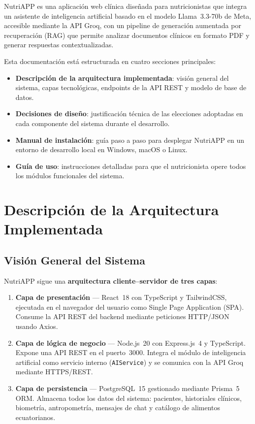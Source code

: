 \documentclass[12pt,a4paper]{article}
\begin{document}
NutriAPP es una aplicación web clínica diseñada para nutricionistas que integra
un asistente de inteligencia artificial basado en el modelo Llama~3.3-70b de Meta,
accesible mediante la API Groq, con un pipeline de generación aumentada por recuperación
(RAG) que permite analizar documentos clínicos en formato PDF y generar respuestas
contextualizadas.

Esta documentación está estructurada en cuatro secciones principales:

\begin{itemize}[leftmargin=1.5em]
  \item \textbf{Descripción de la arquitectura implementada}: visión general del
        sistema, capas tecnológicas, endpoints de la API REST y modelo de base de datos.
  \item \textbf{Decisiones de diseño}: justificación técnica de las elecciones
        adoptadas en cada componente del sistema durante el desarrollo.
  \item \textbf{Manual de instalación}: guía paso a paso para desplegar NutriAPP
        en un entorno de desarrollo local en Windows, macOS o Linux.
  \item \textbf{Guía de uso}: instrucciones detalladas para que el nutricionista
        opere todos los módulos funcionales del sistema.
\end{itemize}

\clearpage
\section{Descripción de la Arquitectura Implementada}

\subsection{Visión General del Sistema}

NutriAPP sigue una \textbf{arquitectura cliente--servidor de tres capas}:

\begin{enumerate}[leftmargin=2em]
  \item \textbf{Capa de presentación} — React~18 con TypeScript y TailwindCSS,
        ejecutada en el navegador del usuario como Single Page Application (SPA).
        Consume la API REST del backend mediante peticiones HTTP/JSON usando Axios.
  \item \textbf{Capa de lógica de negocio} — Node.js~20 con Express.js~4 y TypeScript.
        Expone una API REST en el puerto~3000. Integra el módulo de inteligencia
        artificial como servicio interno (\texttt{AIService}) y se comunica con la
        API Groq mediante HTTPS/REST.
  \item \textbf{Capa de persistencia} — PostgreSQL~15 gestionado mediante Prisma~5
        ORM. Almacena todos los datos del sistema: pacientes, historiales clínicos,
        biometría, antropometría, mensajes de chat y catálogo de alimentos ecuatorianos.
\end{enumerate}
\end{document}
